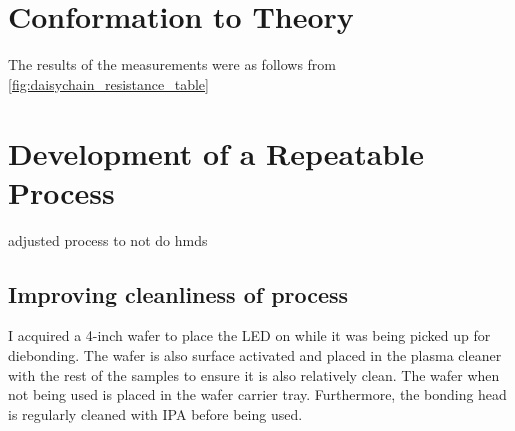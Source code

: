 \section{Conformation to Theory}

The results of the measurements were as follows from \ref{fig:daisychain_resistance_table}





\section{Development of a Repeatable Process}

adjusted process to not do hmds


\subsection{Improving cleanliness of process}

I acquired a 4-inch wafer to place the LED on while it was being picked up for diebonding. The wafer is also surface activated and placed in the plasma cleaner with the rest of the samples to ensure it is also relatively clean. The wafer when not being used is placed in the wafer carrier tray. Furthermore, the bonding head is regularly cleaned with IPA before being used.
